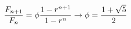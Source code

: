 \documentclass[preview]{standalone}
\begin{document}
\begin{align*}
\special{dvisvgm:raw <g id='unique000'>}\frac{F_{n+1}}{F_n}=\phi\frac{1-r^{n+1}}{1-r^n}\to\phi=\frac{1+\sqrt5}{2}\special{dvisvgm:raw </g>}
\end{align*}
\end{document}
